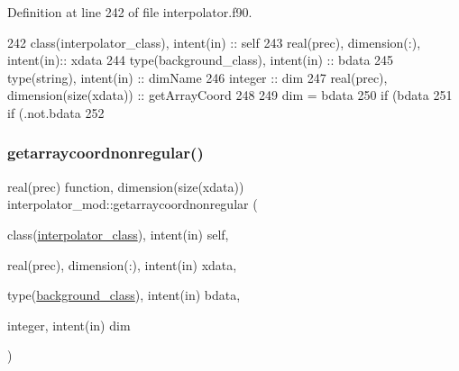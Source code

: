 Definition at line 242 of file interpolator.\+f90.


\begin{DoxyCode}
242     \textcolor{keywordtype}{class}(interpolator\_class), \textcolor{keywordtype}{intent(in)} :: self
243     \textcolor{keywordtype}{real(prec)}, \textcolor{keywordtype}{dimension(:)}, \textcolor{keywordtype}{intent(in)}:: xdata
244     \textcolor{keywordtype}{type}(background\_class), \textcolor{keywordtype}{intent(in)} :: bdata
245     \textcolor{keywordtype}{type}(string), \textcolor{keywordtype}{intent(in)} :: dimName
246     \textcolor{keywordtype}{integer} :: dim
247     \textcolor{keywordtype}{real(prec)}, \textcolor{keywordtype}{dimension(size(xdata))} :: getArrayCoord
248 
249     dim = bdata%
250     \textcolor{keywordflow}{if} (bdata%
251     \textcolor{keywordflow}{if} (.not.bdata%
252 
\end{DoxyCode}
\mbox{\label{namespaceinterpolator__mod_a8c61cbe21c0cf09029e9117b7b1520df}} 
\subsubsection{\texorpdfstring{getarraycoordnonregular()}{getarraycoordnonregular()}}
{\footnotesize\ttfamily real(prec) function, dimension(size(xdata)) interpolator\+\_\+mod\+::getarraycoordnonregular (\begin{DoxyParamCaption}\item[{class(\mbox{\hyperlink{structinterpolator__mod_1_1interpolator__class}{interpolator\+\_\+class}}), intent(in)}]{self,  }\item[{real(prec), dimension(\+:), intent(in)}]{xdata,  }\item[{type(\mbox{\hyperlink{structbackground__mod_1_1background__class}{background\+\_\+class}}), intent(in)}]{bdata,  }\item[{integer, intent(in)}]{dim }\end{DoxyParamCaption})\hspace{0.3cm}{\ttfamily [private]}}



